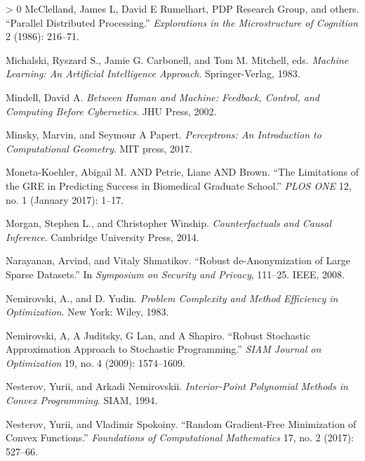\documentclass{tufte-book}
\newlength{\cslhangindent}
\newenvironment{CSLReferences}[3] %
 {%
  \setlength{\parindent}{0pt}
  \ifodd #1 \everypar{\setlength{\hangindent}{\cslhangindent}}\ignorespaces\fi
  \ifnum #2 > 0
  \setlength{\parskip}{#3\baselineskip}
  \fi
 }%
 {
 }
\begin{document}
\begin{CSLReferences}{1}{0}
\leavevmode\hypertarget{ref-mcclelland1986parallel}{}%
McClelland, James L, David E Rumelhart, PDP Research Group, and others.
{``Parallel Distributed Processing.''} \emph{Explorations in the
Microstructure of Cognition} 2 (1986): 216--71.

\leavevmode\hypertarget{ref-Michalski83}{}%
Michalski, Ryszard S., Jamie G. Carbonell, and Tom M. Mitchell, eds.
\emph{Machine Learning: An Artificial Intelligence Approach}.
Springer-Verlag, 1983.

\leavevmode\hypertarget{ref-mindell2002between}{}%
Mindell, David A. \emph{Between Human and Machine: Feedback, Control,
and Computing Before Cybernetics}. JHU Press, 2002.

\leavevmode\hypertarget{ref-minsky2017perceptrons}{}%
Minsky, Marvin, and Seymour A Papert. \emph{Perceptrons: An Introduction
to Computational Geometry}. MIT press, 2017.

\leavevmode\hypertarget{ref-moneta-koehler2017the}{}%
Moneta-Koehler, Abigail M. AND Petrie, Liane AND Brown. {``The
Limitations of the GRE in Predicting Success in Biomedical Graduate
School.''} \emph{PLOS ONE} 12, no. 1 (January 2017): 1--17.

\leavevmode\hypertarget{ref-morgan2014counterfactuals}{}%
Morgan, Stephen L., and Christopher Winship. \emph{Counterfactuals and
Causal Inference}. Cambridge University Press, 2014.

\leavevmode\hypertarget{ref-narayanan2008robust}{}%
Narayanan, Arvind, and Vitaly Shmatikov. {``Robust de-Anonymization of
Large Sparse Datasets.''} In \emph{Symposium on Security and Privacy},
111--25. IEEE, 2008.

\leavevmode\hypertarget{ref-NemirovskiYudinBook}{}%
Nemirovski, A., and D. Yudin. \emph{Problem Complexity and Method
Efficiency in Optimization}. New York: Wiley, 1983.

\leavevmode\hypertarget{ref-Nemirovski09}{}%
Nemirovski, A, A Juditsky, G Lan, and A Shapiro. {``Robust Stochastic
Approximation Approach to Stochastic Programming.''} \emph{SIAM Journal
on Optimization} 19, no. 4 (2009): 1574--1609.

\leavevmode\hypertarget{ref-nesterov-nemirovskii-ip}{}%
Nesterov, Yurii, and Arkadi Nemirovskii. \emph{Interior-Point Polynomial
Methods in Convex Programming}. SIAM, 1994.

\leavevmode\hypertarget{ref-nesterov2017random}{}%
Nesterov, Yurii, and Vladimir Spokoiny. {``Random Gradient-Free
Minimization of Convex Functions.''} \emph{Foundations of Computational
Mathematics} 17, no. 2 (2017): 527--66.


\end{CSLReferences}
\end{document}
